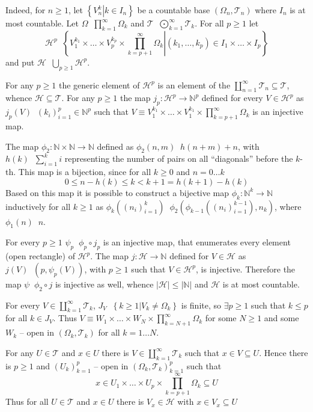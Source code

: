 \documentclass[a4paper]{article}
\newcommand{\obj}[1]{\left\{ #1 \right \}}
\newcommand{\brac}[1]{\left ( #1 \right )}
\newcommand{\induc}[1]{\left . #1 \right \vert}
\newcommand{\abs}[1]{\left | #1 \right |}
\newcommand{\Tcal}{\mathcal{T}}
\newcommand{\defn}{\mathop{\overset{\Delta}{=}}\nolimits}
\begin{document}
Indeed, for $n\geq 1$, let $\obj{ \induc{V_n^k} k\in I_n }$ be a countable base $\brac{\Omega_n, \Tcal_n}$ where $I_n$ is at most countable. Let $\Omega\defn \prod_{k=1}^\infty \Omega_k$ and $\Tcal \defn \bigodot_{k=1}^\infty \Tcal_k$. For all $p\geq 1$ let\[ \mathcal{H}^p \defn \obj{ \induc{ V_1^{k_1} \times \ldots \times V_p^{k_p} \times \prod_{k=p+1}^\infty \Omega_k } \brac{k_1, \ldots,  k_p}\in I_1\times \ldots \times I_p }\] and put $\mathcal{H} \defn \bigcup_{p\geq 1} \mathcal{H}^p$.

For any $p\geq 1$ the generic element of $\mathcal{H}^p$ is an element of the $\coprod_{n=1}^\infty \Tcal_n\subseteq \Tcal$, whence $\mathcal{H}\subseteq \Tcal$. For any $p\geq 1$ the map $j_p:\mathcal{H}^p\to \mathbb{N}^p$ defined for every $V\in \mathcal{H}^p$ as $j_p\brac{V}\defn \brac{k_i}_{i=1}^p\in \mathbb{N}^p$ such that $V \equiv V_1^{k_1}\times \ldots \times V_1^{k_1}\times \prod_{k=p+1}^\infty \Omega_k$ is an injective map.

The map $\phi_2:\mathbb{N}\times \mathbb{N}\to \mathbb{N}$ defined as $\phi_2\brac{n,m}\defn h\brac{n+m} + n$, with $h\brac{k}\defn \sum_{i=1}^k i$ representing the number of pairs on all ``diagonals'' before the $k$-th. This map is a bijection, since for all $k\geq 0$ and $n=0\ldots k$ \[0 \leq n-h\brac{k} \leq k < k + 1 = h\brac{k+1}-h\brac{k}\] Based on this map it is possible to construct a bijective map $\phi_k:\mathbb{N}^k\to \mathbb{N}$ inductively for all $k\geq 1$ as $\phi_k\brac{\brac{n_i}_{i=1}^k} \defn \phi_2\brac{ \phi_{k-1}\brac{ \brac{n_i}_{i=1}^{k-1} }, n_k }$, where $\phi_1\brac{n} \defn n$.

For every $p\geq 1$ $\psi_p\defn \phi_p\circ j_p$ is an injective map, that enumerates every element (open rectangle) of $\mathcal{H}^p$. The map $j:\mathcal{H}\to \mathbb{N}$ defined for $V\in \mathcal{H}$ as $j\brac{V}\defn \brac{p, \psi_p\brac{V}}$, with $p\geq 1$ such that $V\in \mathcal{H}^p$, is injective. Therefore the map $\psi \defn \phi_2\circ j$ is injective as well, whence $\abs{ \mathcal{ H } } \leq \abs{ \mathbb{ N } }$ and $\mathcal{H}$ is at most countable.

For every $V\in \coprod_{k=1}^\infty \Tcal_k$, $J_V\defn \obj{ \induc{ k\geq 1 } V_k\neq \Omega_k }$ is finite, so $\exists p\geq 1$ such that $k\leq p$ for all $k\in J_V$. Thus $V\equiv W_1\times \ldots \times W_N \times \prod_{k=N+1}^\infty \Omega_k$ for some $N\geq 1$ and some $W_k$ -- open in $\brac{ \Omega_k, \Tcal_k}$ for all $k=1\ldots N$.

For any $U\in \Tcal$ and $x\in U$ there is $V\in \coprod_{k=1}^\infty \Tcal_k$ such that $x\in V\subseteq U$. Hence there is $p\geq 1$ and $\brac{U_k}_{k=1}^p$ -- open in $\brac{\Omega_k, \Tcal_k}_{k=1}^p$ such that \[x\in U_1\times \ldots \times U_p\times \prod_{k=p+1}^\infty \Omega_k \subseteq U\] Thus for all $U\in \Tcal$ and $x\in U$ there is $V_x\in \mathcal{H}$ with $x\in V_x\subseteq U$
\end{document}
